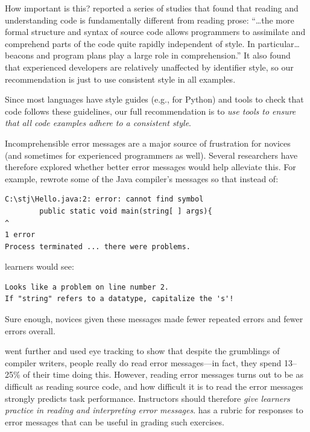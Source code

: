 How important is this? \cite{Bink2012} reported a series of studies
that found that reading and understanding code is fundamentally
different from reading prose: ``{\ldots}the more formal structure
and syntax of source code allows programmers to assimilate and
comprehend parts of the code quite rapidly independent of style. In
particular{\ldots}beacons and program plans play a large role in
comprehension.'' It also found that experienced developers are relatively
unaffected by identifier style, so our recommendation is just to use
consistent style in all examples.

Since most languages have style guides (e.g.,  for
Python) and tools to check that code follows these guidelines, our
full recommendation is to \emph{use tools to ensure that all code examples
adhere to a consistent style}.


Incomprehensible error messages are a major source of frustration for
novices (and sometimes for experienced programmers as well). Several
researchers have therefore explored whether better error messages would
help alleviate this. For example, \cite{Beck2016} rewrote some of the
Java compiler's messages so that instead of:

\begin{verbatim}
C:\stj\Hello.java:2: error: cannot find symbol
        public static void main(string[ ] args){
^
1 error
Process terminated ... there were problems.
\end{verbatim}

learners would see:

\begin{verbatim}
Looks like a problem on line number 2.
If "string" refers to a datatype, capitalize the 's'!
\end{verbatim}

Sure enough, novices given these messages made fewer repeated errors and
fewer errors overall.

\cite{Bari2017} went further and used eye tracking to show that
despite the grumblings of compiler writers, people really do read error
messages---in fact, they spend 13--25\% of their time doing this. However,
reading error messages turns out to be as difficult as reading source
code, and how difficult it is to read the error messages strongly
predicts task performance. Instructors should therefore \emph{give learners
practice in reading and interpreting error messages}. \cite{Marc2011}
has a rubric for responses to error messages that can be useful in
grading such exercises.

